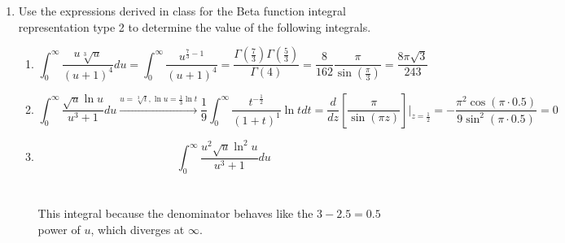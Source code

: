 \documentclass{article}
\begin{document}
\begin{enumerate}
\begin{enumerate}
        \item \[\int_{0}^{1} \frac{\ln^2 t}{\sqrt{1-t^2}}dt \xrightarrow{u=t^2, du=2tdt}\frac 1 8\int_{0}^{1} u^{-\frac 1 2}(1-u)^{-\frac 1 2}\ln^2 u du\]
        We can just use the $\varepsilon^2$ component from 2 (c).
        \[\frac 1 8\int_{0}^{1} u^{-\frac 1 2}(1-u)^{-\frac 1 2}\ln^2 u du \rightarrow \frac{\pi}{4}\left(2\ln^2 2 + \zeta(2) \right) = \boxed{\frac{\pi}{2} \ln^2 2 + \frac{\pi^3}{24}}\]
    \end{enumerate}
    \item Use the expressions derived in class for the Beta function integral representation type 2 to determine the value of the following integrals.
    \begin{enumerate}
        \item \[\int_{0}^{\infty} \frac{u\sqrt[3]{u}}{(u+1)^4}du = \int_{0}^{\infty}\frac{u^{\frac 7 3 - 1}}{(u+1)^4} = \frac{\Gamma(\frac 7 3) \Gamma(\frac 5 3)}{\Gamma(4)} = \frac{8}{162} \frac{\pi}{\sin(\frac{\pi}{3})} =\boxed{\frac{8\pi\sqrt 3}{243}}\]
        \item \[\int_{0}^{\infty} \frac{\sqrt u \ln u}{u^3 + 1}du \xrightarrow{u=\sqrt[3]t, \ln u = \frac 1 3 \ln t} \frac 1 9 \int_{0}^{\infty} \frac{t^{-\frac 1 2}}{(1+t)^1}\ln t dt =\frac{d}{dz}\left[ \frac{\pi}{\sin(\pi z)}\right]\bigg|_{z=\frac 1 2} = -\frac{\pi^2 \cos (\pi \cdot 0.5)}{9\sin^2(\pi \cdot 0.5)} = \boxed{0}\]
        \item \[\int_{0}^{\infty} \frac{u^2 \sqrt u \ln^2 u}{u^3 + 1}du\]
        \\ \\
        This integral  because the denominator behaves like the $3 - 2.5 = 0.5$ power of $u$, which diverges at $\infty$.
    \end{enumerate}
\end{enumerate}
\end{document}
